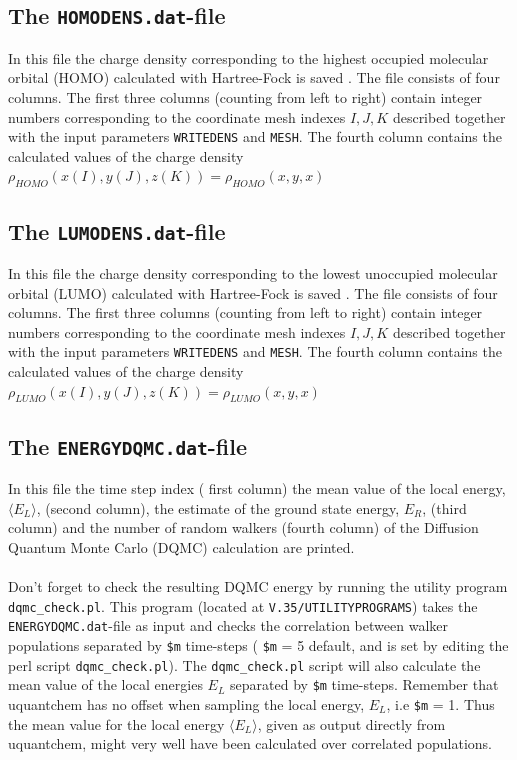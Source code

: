 \documentclass[a4paper,twoside,openany]{book}
\begin{document}
{{\subsection{The \texttt{HOMODENS.dat}-file}
In this file the charge density corresponding to the highest occupied molecular orbital (HOMO) calculated with Hartree-Fock is saved . The file consists of four columns. The first three columns (counting from left to right) 
contain integer numbers corresponding to the coordinate mesh indexes $I,J,K$ described together with the input parameters \texttt{WRITEDENS} and \texttt{MESH}. The fourth column 
contains the calculated values of the charge density \\ $\rho_{HOMO}(x(I),y(J),z(K)) = \rho_{HOMO}(x,y,x)$

\subsection{The \texttt{LUMODENS.dat}-file}
In this file the charge density corresponding to the lowest  unoccupied molecular orbital (LUMO) calculated with Hartree-Fock is saved . The file consists of four columns. The first three columns (counting from left to right) 
contain integer numbers corresponding to the coordinate mesh indexes $I,J,K$ described together with the input parameters \texttt{WRITEDENS} and \texttt{MESH}. The fourth column 
contains the calculated values of the charge density \\ $\rho_{LUMO}(x(I),y(J),z(K)) = \rho_{LUMO}(x,y,x)$

\subsection{The \texttt{ENERGYDQMC.dat}-file} 
In this file the time step index ( first column) the mean value of the local energy, $\langle E_{L} \rangle$, (second column), the estimate of the ground state energy, $E_{R}$, (third column) and the number 
of random walkers (fourth column) of the Diffusion Quantum Monte Carlo (DQMC) calculation are printed. \\ \\
\noindent
 Don't forget to check the resulting DQMC energy by running the utility program \texttt{dqmc\_check.pl}.
This program (located at \texttt{V.35/UTILITYPROGRAMS}) takes the \texttt{ENERGYDQMC.dat}-file as input and checks the correlation between walker populations separated by \texttt{\$m} time-steps (  \texttt{\$m} = 5 default, and is set by editing the perl script \texttt{dqmc\_check.pl}). The \texttt{dqmc\_check.pl} script will also calculate the mean value of the local energies  $E_{L}$ separated by \texttt{\$m} time-steps.
Remember that uquantchem has no offset when sampling the local energy, $E_{L}$, i.e  \texttt{\$m} = 1. Thus the mean value for the local energy $\langle E_{L}\rangle$, given as output directly from uquantchem, might very well have been calculated 
over correlated populations.

}}
\end{document}
